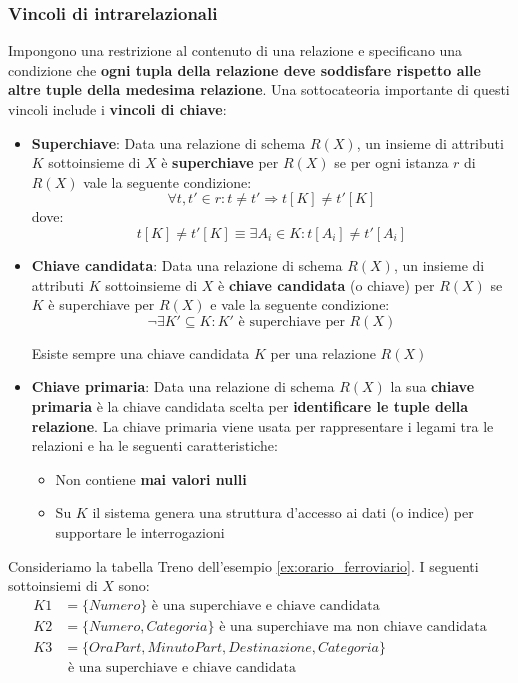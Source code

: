 \documentclass[a4paper,twoside]{article}
\begin{document}
\subsubsection{Vincoli di intrarelazionali}
Impongono una restrizione al contenuto di una relazione e specificano una condizione che 
\textbf{ogni tupla della relazione deve soddisfare rispetto alle altre tuple della medesima
relazione}. Una sottocateoria importante di questi vincoli include i \textbf{vincoli di chiave}:
\begin{itemize}
  \item \textbf{Superchiave}: Data una relazione di schema \( R(X) \), un insieme di
    attributi \( K \) sottoinsieme di \( X \) è \textbf{superchiave} per \( R(X) \) se
    per ogni istanza \( r \) di \( R(X) \) vale la seguente condizione:
    \[
      \forall t, t' \in r: t \neq t' \Rightarrow t[K] \neq t'[K]
    \] 
    dove:
    \[
      t[K] \neq t'[K] \equiv \exists A_i \in K: t[A_i] \neq t'[A_i]
    \] 

  \item \textbf{Chiave candidata}: Data una relazione di schema \( R(X) \), un insieme di
    attributi \( K \) sottoinsieme di \( X \) è \textbf{chiave candidata} (o chiave) per
    \( R(X) \) se \( K \) è superchiave per \( R(X) \) e vale la seguente condizione:
    \[
      \neg \exists K' \subseteq K: K' \text{ è superchiave per } R(X)
    \] 

    \begin{theorem}
      Esiste sempre una chiave candidata \( K \) per una relazione \( R(X) \)
    \end{theorem}

  \item \textbf{Chiave primaria}: Data una relazione di schema \( R(X) \) la sua
    \textbf{chiave primaria} è la chiave candidata scelta per \textbf{identificare le
    tuple della relazione}. La chiave primaria viene usata per rappresentare i legami
    tra le relazioni e ha le seguenti caratteristiche:
    \begin{itemize}
      \item Non contiene \textbf{mai valori nulli}
      \item Su \( K \) il sistema genera una struttura d'accesso ai dati (o indice)
        per supportare le interrogazioni
    \end{itemize}
\end{itemize}

\begin{example}
  Consideriamo la tabella Treno dell'esempio \ref{ex:orario_ferroviario}. I seguenti sottoinsiemi
  di \( X \) sono:
  \[
  \begin{aligned}
    K1 &= \{Numero\} \text{ è una superchiave e chiave candidata }\\
    K2 &= \{Numero, Categoria\} \text{ è una superchiave ma non chiave candidata}\\
    K3 &= \{OraPart, MinutoPart, Destinazione, Categoria\} \\
       &\text{ è una superchiave e chiave candidata}
  \end{aligned}
  \] 
\end{example}
\end{document}
